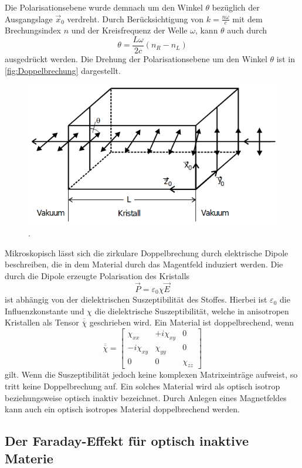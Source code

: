 Die Polarisationsebene wurde demnach um den Winkel $\theta$ bezüglich der Ausgangslage $\vec{x}_0$ verdreht. Durch
Berücksichtigung von $k=\frac{n \omega}{c}$ mit dem Brechungsindex $n$ und der Kreisfrequenz der Welle $\omega$,
kann $\theta$ auch durch 
\begin{equation*}
    \theta=\frac{L\omega}{2c}(n_R-n_L)
\end{equation*}
ausgedrückt werden. Die Drehung der Polarisationsebene um den Winkel $\theta$ ist in \autoref{fig:Doppelbrechung} dargestellt.

\begin{figure}[H]
    \centering
    \includegraphics[scale=0.7]{Abbildungen/Doppelbrechung.png}
    \caption{.\cite{V46_Anhang}}
    \label{fig:Doppelbrechung}
\end{figure}

Mikroskopisch lässt sich die zirkulare Doppelbrechung durch elektrische Dipole beschreiben, die in dem Material durch das 
Magentfeld induziert werden. Die durch die Dipole erzeugte Polarisation des Kristalls 
\begin{equation*}
    \vec{P}=\varepsilon_0\chi\vec{E}
\end{equation*}
ist abhängig von der dielektrischen Suszeptibilität des Stoffes. Hierbei ist $\varepsilon_0$ die Influenzkonstante und $\chi$ die
dielektrische Suszeptibilität, welche in anisotropen Kristallen als Tensor $\overline{\overline{\chi}}$ geschrieben wird.
Ein Material ist doppelbrechend, wenn
\begin{equation}
    \overline{\overline{\chi}}=
    \left[
        \begin{array}{ccc}
        \chi_{xx}          & +i\chi_{xy} & 0         \\ 
        -i\chi_{xy}   & \chi_{yy}        & 0         \\
        0                  & 0                & \chi_{zz}
    \end{array}
    \right]
    \label{eqn:chi}
\end{equation}
gilt.
Wenn die Suszeptibilität jedoch keine komplexen Matrixeinträge aufweist, so tritt keine Doppelbrechung auf.
Ein solches Material wird als optisch isotrop beziehungsweise optisch inaktiv bezeichnet. 
Durch Anlegen eines Magnetfeldes kann auch ein optisch isotropes Material doppelbrechend werden.

\subsection{Der Faraday-Effekt für optisch inaktive Materie}
\label{sub:Faraday}




